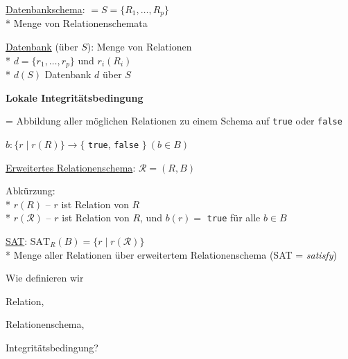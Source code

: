 \begin{items}
	\item \underline{Datenbankschema}: \( = S = \{ R_1, \dots, R_p \} \) \\* Menge von Relationenschemata
	\item \underline{Datenbank} (über \( S \)): Menge von Relationen \\* \( d = \{ r_1, \dots, r_p \} \) und \( r_i(R_i) \) \\* \( d(S) \) Datenbank \( d \) über \( S \)
\end{items}

\textbf{Lokale Integritätsbedingung}
\begin{items}
	\item = Abbildung aller möglichen Relationen zu einem Schema auf \lstinline{true} oder \lstinline{false}
	\item \( b:\{ r \mid r(R) \} \to \{ \) \lstinline{true}, \lstinline{false} \( \} \ (b \in B) \)
	\item \underline{Erweitertes Relationenschema}: \( \mathcal{R} = (R, B) \)
	\item Abkürzung: \\* \( r(R) \) -- \( r \) ist Relation von \( R \) \\* \( r(\mathcal{R}) \) -- \( r \) ist Relation von \( R \), und \( b(r)= \) \lstinline{true} für alle \( b \in B \)
	\item \underline{SAT}: \( \text{SAT}_R(B) = \{ r \mid r(\mathcal{R}) \} \) \\* Menge aller Relationen über erweitertem Relationenschema (SAT = \emph{satisfy})
\end{items}

\begin{fragen}
	\begin{enumeration}
		\item Wie definieren wir
		\begin{enumeration}
			\item Relation,	
			\item Relationenschema,
			\item Integritätsbedingung?
		\end{enumeration}
	\end{enumeration}
\end{fragen}